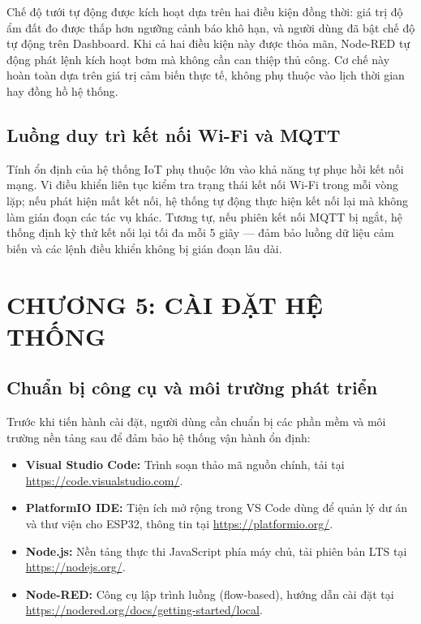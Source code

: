 \documentclass[12pt, a4paper]{article}
\begin{document}
Chế độ tưới tự động được kích hoạt dựa trên hai điều kiện đồng thời: giá trị độ ẩm đất đo được thấp hơn ngưỡng cảnh báo khô hạn, và người dùng đã bật chế độ tự động trên Dashboard. Khi cả hai điều kiện này được thỏa mãn, Node-RED tự động phát lệnh kích hoạt bơm mà không cần can thiệp thủ công. Cơ chế này hoàn toàn dựa trên giá trị cảm biến thực tế, không phụ thuộc vào lịch thời gian hay đồng hồ hệ thống.

\subsection{Luồng duy trì kết nối Wi-Fi và MQTT}

Tính ổn định của hệ thống IoT phụ thuộc lớn vào khả năng tự phục hồi kết nối mạng. Vi điều khiển liên tục kiểm tra trạng thái kết nối Wi-Fi trong mỗi vòng lặp; nếu phát hiện mất kết nối, hệ thống tự động thực hiện kết nối lại mà không làm gián đoạn các tác vụ khác. Tương tự, nếu phiên kết nối MQTT bị ngắt, hệ thống định kỳ thử kết nối lại tối đa mỗi 5 giây — đảm bảo luồng dữ liệu cảm biến và các lệnh điều khiển không bị gián đoạn lâu dài.


\section*{CHƯƠNG 5: CÀI ĐẶT HỆ THỐNG}
{}
\label{sec:ch5}
\setcounter{section}{5}
\setcounter{subsection}{0}

\subsection{Chuẩn bị công cụ và môi trường phát triển}

Trước khi tiến hành cài đặt, người dùng cần chuẩn bị các phần mềm và môi trường nền tảng sau để đảm bảo hệ thống vận hành ổn định:
\begin{itemize}
    \item \textbf{Visual Studio Code:} Trình soạn thảo mã nguồn chính, tải tại \url{https://code.visualstudio.com/}.
    \item \textbf{PlatformIO IDE:} Tiện ích mở rộng trong VS Code dùng để quản lý dư án và thư viện cho ESP32, thông tin tại \url{https://platformio.org/}.
    \item \textbf{Node.js:} Nền tảng thực thi JavaScript phía máy chủ, tải phiên bản LTS tại \url{https://nodejs.org/}.
    \item \textbf{Node-RED:} Công cụ lập trình luồng (flow-based), hướng dẫn cài đặt tại \url{https://nodered.org/docs/getting-started/local}.
\end{itemize}
\end{document}

